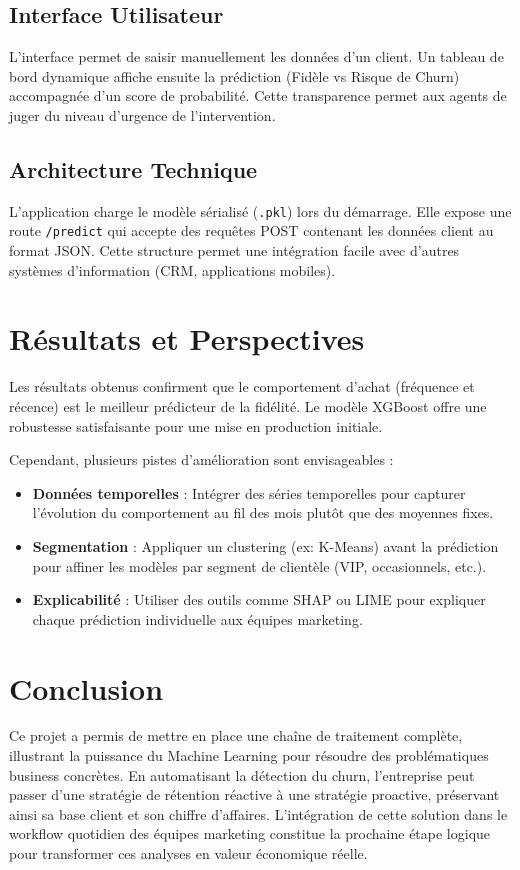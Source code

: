 \documentclass[12pt,a4paper]{article}
\begin{document}
\subsection{Interface Utilisateur}
L'interface permet de saisir manuellement les données d'un client. Un tableau de bord dynamique affiche ensuite la prédiction (Fidèle vs Risque de Churn) accompagnée d'un score de probabilité. Cette transparence permet aux agents de juger du niveau d'urgence de l'intervention.

\subsection{Architecture Technique}
L'application charge le modèle sérialisé (\texttt{.pkl}) lors du démarrage. Elle expose une route \texttt{/predict} qui accepte des requêtes POST contenant les données client au format JSON. Cette structure permet une intégration facile avec d'autres systèmes d'information (CRM, applications mobiles).

\section{Résultats et Perspectives}
Les résultats obtenus confirment que le comportement d'achat (fréquence et récence) est le meilleur prédicteur de la fidélité. Le modèle XGBoost offre une robustesse satisfaisante pour une mise en production initiale.

Cependant, plusieurs pistes d'amélioration sont envisageables :
\begin{itemize}
    \item \textbf{Données temporelles} : Intégrer des séries temporelles pour capturer l'évolution du comportement au fil des mois plutôt que des moyennes fixes.
    \item \textbf{Segmentation} : Appliquer un clustering (ex: K-Means) avant la prédiction pour affiner les modèles par segment de clientèle (VIP, occasionnels, etc.).
    \item \textbf{Explicabilité} : Utiliser des outils comme SHAP ou LIME pour expliquer chaque prédiction individuelle aux équipes marketing.
\end{itemize}

\section{Conclusion}
Ce projet a permis de mettre en place une chaîne de traitement complète, illustrant la puissance du Machine Learning pour résoudre des problématiques business concrètes. En automatisant la détection du churn, l'entreprise peut passer d'une stratégie de rétention réactive à une stratégie proactive, préservant ainsi sa base client et son chiffre d'affaires. L'intégration de cette solution dans le workflow quotidien des équipes marketing constitue la prochaine étape logique pour transformer ces analyses en valeur économique réelle.
\end{document}

